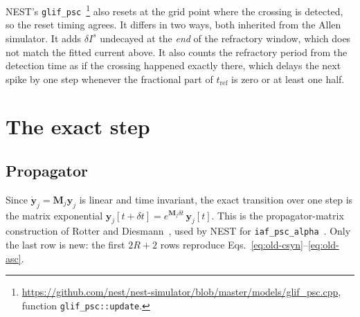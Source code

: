 \documentclass[11pt,a4paper,numbers=noenddot]{scrartcl}
\newcommand{\dt}{\delta t}
\newcommand{\code}[1]{\texttt{\small #1}}
\begin{document}
NEST's \code{glif\_psc}~\cite{gewaltig2007nest}\footnote{%
\url{https://github.com/nest/nest-simulator/blob/master/models/glif_psc.cpp},
function \code{glif\_psc::update}.} also resets at the grid point where the
crossing is detected, so the reset timing agrees. It differs in two ways,
both inherited from the Allen simulator. It adds $\delta I^{s}$ undecayed at
the \emph{end} of the refractory window, which does not match the fitted
current above. It also counts the refractory period from the detection time
as if the crossing happened exactly there, which delays the next spike by one
step whenever the fractional part of $t_{\mathrm{ref}}$ is zero or at least
one half.

\section{The exact step}
\label{sec:exact}

\subsection{Propagator}

Since $\dot{\bm y}_j = \bm{M}_j \bm{y}_j$ is linear and time invariant, the
exact transition over one step is the matrix exponential
$\bm{y}_j[t+\dt] = e^{\bm{M}_j \dt}\,\bm{y}_j[t]$. This is the
propagator-matrix construction of Rotter and
Diesmann~\cite{rotter1999exact}, used by NEST for
\code{iaf\_psc\_alpha}~\cite{gewaltig2007nest}. Only the last row is new: the
first $2R+2$ rows reproduce Eqs.~\eqref{eq:old-csyn}--\eqref{eq:old-asc}.
\end{document}
